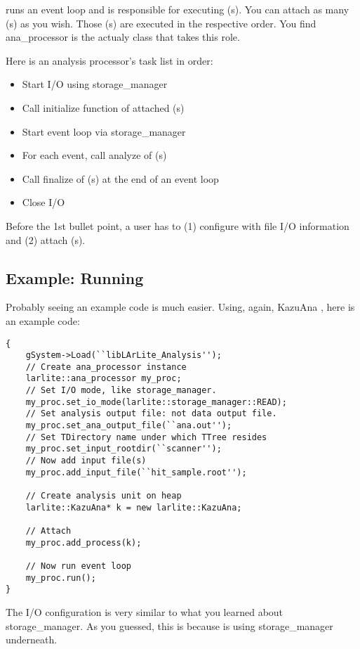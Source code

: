 
\anaproc runs an event loop and is responsible for executing \anaunit(s). You can attach as many \anaunit(s) as you wish. Those \anaunit(s) are executed in the respective order. You find {\ttfamily ana\_processor} is the actualy \CPP class that takes this role.

Here is an analysis processor's task list in order:
\begin{itemize}
\item Start I/O using {\ttfamily storage\_manager}
\item Call {\ttfamily initialize} function of attached \anaunit(s)
\item Start event loop via {\ttfamily storage\_manager}
\item For each event, call {\ttfamily analyze} of \anaunit(s)
\item Call {\ttfamily finalize} of \anaunit(s) at the end of an event loop
\item Close I/O
\end{itemize}
Before the 1st bullet point, a user has to (1) configure \anaproc with file I/O information and (2) attach \anaunit(s).

\subsection{Example: Running \anaproc}
Probably seeing an example code is much easier. Using, again, {\ttfamily KazuAna} \anaunit, here is an example \CINT code:
\begin{lstlisting}
{
    gSystem->Load(``libLArLite_Analysis'');
    // Create ana_processor instance
    larlite::ana_processor my_proc;
    // Set I/O mode, like storage_manager.
    my_proc.set_io_mode(larlite::storage_manager::READ);
    // Set analysis output file: not data output file.
    my_proc.set_ana_output_file(``ana.out'');
    // Set TDirectory name under which TTree resides
    my_proc.set_input_rootdir(``scanner'');
    // Now add input file(s)
    my_proc.add_input_file(``hit_sample.root'');
    
    // Create analysis unit on heap
    larlite::KazuAna* k = new larlite::KazuAna;
    
    // Attach
    my_proc.add_process(k);

    // Now run event loop
    my_proc.run();
}
\end{lstlisting}
The I/O configuration is very similar to what you learned about {\ttfamily storage\_manager}. As you guessed, this is because \anaproc is using {\ttfamily storage\_manager} underneath.

